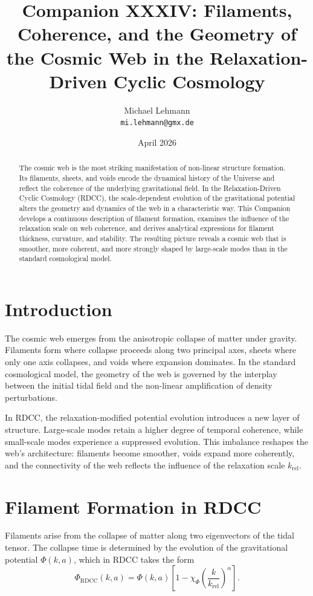 \documentclass[11pt,a4paper]{article}
\title{\textbf{Companion XXXIV: Filaments, Coherence, and the Geometry of the Cosmic Web in the Relaxation-Driven Cyclic Cosmology}}
\author{Michael Lehmann \\ \texttt{mi.lehmann@gmx.de}}
\date{April 2026}
\begin{document}
\maketitle

\begin{abstract}
The cosmic web is the most striking manifestation of non-linear structure formation. 
Its filaments, sheets, and voids encode the dynamical history of the Universe and 
reflect the coherence of the underlying gravitational field. In the 
Relaxation-Driven Cyclic Cosmology (RDCC), the scale-dependent evolution of the 
gravitational potential alters the geometry and dynamics of the web in a 
characteristic way. This Companion develops a continuous description of filament 
formation, examines the influence of the relaxation scale on web coherence, and 
derives analytical expressions for filament thickness, curvature, and stability. 
The resulting picture reveals a cosmic web that is smoother, more coherent, and 
more strongly shaped by large-scale modes than in the standard cosmological model.
\end{abstract}
\section{Introduction}

The cosmic web emerges from the anisotropic collapse of matter under gravity. 
Filaments form where collapse proceeds along two principal axes, sheets where only 
one axis collapses, and voids where expansion dominates. In the standard 
cosmological model, the geometry of the web is governed by the interplay between 
the initial tidal field and the non-linear amplification of density perturbations.

In RDCC, the relaxation-modified potential evolution introduces a new layer of 
structure. Large-scale modes retain a higher degree of temporal coherence, while 
small-scale modes experience a suppressed evolution. This imbalance reshapes the 
web's architecture: filaments become smoother, voids expand more coherently, and 
the connectivity of the web reflects the influence of the relaxation scale 
$k_{\mathrm{rel}}$.
\section{Filament Formation in RDCC}

Filaments arise from the collapse of matter along two eigenvectors of the tidal 
tensor. The collapse time is determined by the evolution of the gravitational 
potential $\Phi(k,a)$, which in RDCC takes the form
\begin{equation}
    \Phi_{\mathrm{RDCC}}(k,a)
    = \Phi(k,a)
      \left[1 - \chi_{\Phi}
      \left(\frac{k}{k_{\mathrm{rel}}}\right)^{\alpha}\right].
\end{equation}
\end{document}
